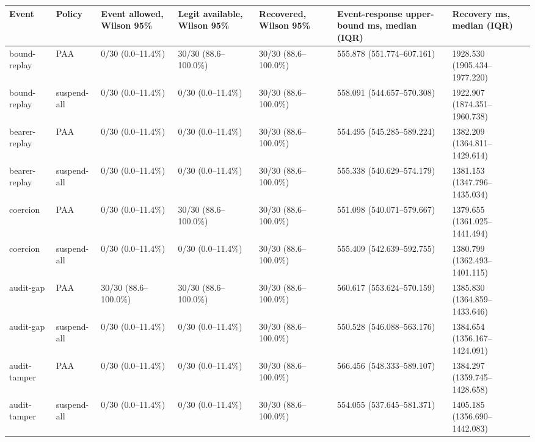 \begin{tabular}{lllllll}
\hline
Event & Policy & Event allowed, Wilson 95\% & Legit available, Wilson 95\% & Recovered, Wilson 95\% & Event-response upper-bound ms, median (IQR) & Recovery ms, median (IQR) \\
\hline
bound-replay & PAA & 0/30 (0.0--11.4\%) & 30/30 (88.6--100.0\%) & 30/30 (88.6--100.0\%) & 555.878 (551.774--607.161) & 1928.530 (1905.434--1977.220) \\
bound-replay & suspend-all & 0/30 (0.0--11.4\%) & 0/30 (0.0--11.4\%) & 30/30 (88.6--100.0\%) & 558.091 (544.657--570.308) & 1922.907 (1874.351--1960.738) \\
bearer-replay & PAA & 0/30 (0.0--11.4\%) & 0/30 (0.0--11.4\%) & 30/30 (88.6--100.0\%) & 554.495 (545.285--589.224) & 1382.209 (1364.811--1429.614) \\
bearer-replay & suspend-all & 0/30 (0.0--11.4\%) & 0/30 (0.0--11.4\%) & 30/30 (88.6--100.0\%) & 555.338 (540.629--574.179) & 1381.153 (1347.796--1435.034) \\
coercion & PAA & 0/30 (0.0--11.4\%) & 30/30 (88.6--100.0\%) & 30/30 (88.6--100.0\%) & 551.098 (540.071--579.667) & 1379.655 (1361.025--1441.494) \\
coercion & suspend-all & 0/30 (0.0--11.4\%) & 0/30 (0.0--11.4\%) & 30/30 (88.6--100.0\%) & 555.409 (542.639--592.755) & 1380.799 (1362.493--1401.115) \\
audit-gap & PAA & 30/30 (88.6--100.0\%) & 30/30 (88.6--100.0\%) & 30/30 (88.6--100.0\%) & 560.617 (553.624--570.159) & 1385.830 (1364.859--1433.646) \\
audit-gap & suspend-all & 0/30 (0.0--11.4\%) & 0/30 (0.0--11.4\%) & 30/30 (88.6--100.0\%) & 550.528 (546.088--563.176) & 1384.654 (1356.167--1424.091) \\
audit-tamper & PAA & 0/30 (0.0--11.4\%) & 0/30 (0.0--11.4\%) & 30/30 (88.6--100.0\%) & 566.456 (548.333--589.107) & 1384.297 (1359.745--1428.658) \\
audit-tamper & suspend-all & 0/30 (0.0--11.4\%) & 0/30 (0.0--11.4\%) & 30/30 (88.6--100.0\%) & 554.055 (537.645--581.371) & 1405.185 (1356.690--1442.083) \\
\hline
\end{tabular}
